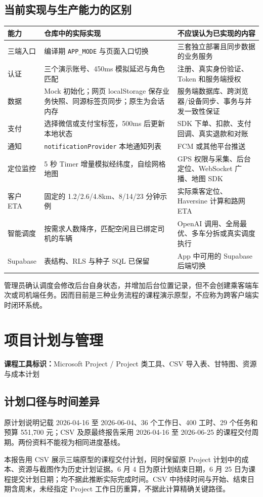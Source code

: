 \documentclass[UTF8,fontset=fandol,zihao=-4,oneside]{ctexrep}
\newcommand{\toolmark}[1]{\par\noindent\textbf{课程工具标识：}#1\par}
\begin{document}
\section{当前实现与生产能力的区别}
\begin{longtable}{p{3cm}p{5.5cm}p{6.2cm}}
\toprule 能力 & 仓库中的实际实现 & 不应误认为已实现的内容 \\ \midrule
三端入口 & 编译期 \texttt{APP\_MODE} 与页面入口切换 & 三套独立部署且同步数据的业务服务 \\
认证 & 三个演示账号、450ms 模拟延迟与角色匹配 & 注册、真实身份验证、Token 和服务端授权 \\
数据 & Mock 初始化；网页 localStorage 保存业务快照、同源标签页同步；原生为会话内存 & 服务端数据库、跨浏览器/设备同步、事务与并发一致性保证 \\
支付 & 选择微信或支付宝标签，500ms 后更新本地状态 & SDK 下单、扣款、支付回调、真实退款和对账 \\
通知 & \texttt{notificationProvider} 本地通知列表 & FCM 或其他平台推送 \\
定位监控 & 5 秒 Timer 增量模拟经纬度，自绘网格地图 & GPS 权限与采集、后台定位、WebSocket 广播、地图 SDK \\
客户 ETA & 固定的 1.2/2.6/4.8km、8/14/23 分钟示例 & 实际乘客定位、Haversine 计算和路网 ETA \\
智能调度 & 按需求人数降序，匹配空闲且已绑定司机的车辆 & OpenAI 调用、全局最优、多车分拆或真实调度执行 \\
Supabase & 表结构、RLS 与种子 SQL 已保留 & App 中可用的 Supabase 后端切换 \\
\bottomrule
\end{longtable}
管理员确认调度会修改后台自身状态，并增加后台位置记录，但不会创建乘客端车次或司机端任务。因而目前是三种业务流程的课程演示原型，不应称为跨客户端实时闭环系统。

\chapter{项目计划与管理}
\toolmark{Microsoft Project / Project 类工具、CSV 导入表、甘特图、资源与成本计划}
\section{计划口径与时间差异}
原计划说明记载 2026-04-16 至 2026-06-04、36 个工作日、400 工时、29 个任务和预算 551,700 元；CSV 及原最终报告采用 2026-04-16 至 2026-06-25 的课程交付周期。两份资料不能视为相同进度基线。

本报告用 CSV 展示三端原型的课程交付计划，同时保留原 Project 计划中的成本、资源与截图作为历史计划证据。6 月 4 日为原计划结束日期，6 月 25 日为课程提交计划日期；均不据此推断实际完成时间。CSV 中持续时间与开始、结束日期含周末，未经指定 Project 工作日历重算，不据此计算精确关键路径。
\end{document}
